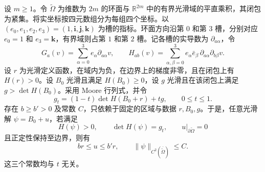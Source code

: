 设 $m\ge1$。令 $\widetilde\Omega$ 为维数为 $2m$ 的环面与 $\mathbb R^{2m}$ 中的有界光滑域的平直乘积，其闭包为紧集。将实坐标按四元数组分为每组四个坐标。以 $(e_0,e_1,e_2,e_3)=(1,\mathbf i,\mathbf j,\mathbf k)$ 为槽的指标。环面方向沿第 $0$ 和第 $3$ 槽，分别对应 $e_0=1$ 和 $e_3=\mathbf k$，有界域则占第 $1$ 和第 $2$ 槽。记各槽的实导数为 $\partial_{a\alpha}$，令
\[
G_a(v)=\sum_{\alpha=0}^3e_\alpha\partial_{a\alpha}v,\qquad
H_{ab}(v)=\sum_{\alpha,\beta=0}^3e_\alpha\bar e_\beta\,\partial_{a\alpha}\partial_{b\beta}v.
\]
设 $r$ 为光滑定义函数，在域内为负，在边界上的梯度非零，且在闭包上有 $H(r)>0$。设 $B_0$ 光滑且满足 $H(B_0)\ge0$，设 $g$ 光滑且在该闭包上满足 $g>\det H(B_0)$。采用 Moore 行列式，并令
\[
g_t=(1-t)\det H(B_0+r)+t g,\qquad 0\le t\le1 .
\]
存在 $b\ge b'>0$ 及常数 $C$，只依赖于固定的区域与数据 $r,B_0,g$。于是，任意光滑解 $\psi=B_0+u$，若满足
\[
H(\psi)>0,\qquad \det H(\psi)=g_t,\qquad u|_{\partial\widetilde\Omega}=0
\]
且正定性保持至边界，则有
\[
br\le u\le b'r,\qquad \|\psi\|_{C^2(\overline{\widetilde\Omega})}\le C .
\]
这三个常数均与 $t$ 无关。
